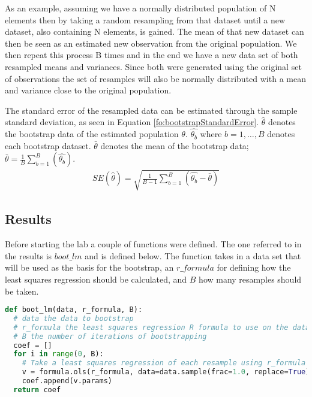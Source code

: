 As an example, assuming we have a normally distributed population of N elements then by taking a random resampling from that dataset until a new dataset, also containing N elements, is gained. The mean of that new dataset can then be seen as an estimated new observation from the original population. We then repeat this process B times and in the end we have a new data set of both resampled means and variances. Since both were generated using the original set of observations the set of resamples will also be normally distributed with a mean and variance close to the original population.
\fi

The standard error of the resampled data can be estimated through the sample standard deviation, as seen in Equation \ref{fo:bootstrapStandardError}. $\hat{\theta}$ denotes the bootstrap data of the estimated population $\theta$. $\hat{\theta_{b}}$ where $b=1,\dots,B$ denotes each bootstrap dataset. $\bar{\theta}$ denotes the mean of the bootstrap data; $\bar{\theta} = \frac{1}{B} \sum_{b=1}^{B}(\hat{\theta_{b}})$.
\begin{align}\label{fo:bootstrapStandardError}
	SE(\hat{\theta}) = \sqrt{\frac{1}{B-1} \sum_{b=1}^{B}(\hat{\theta_{b}} - \bar{\theta})} 
\end{align}


\subsection{Results}%

Before starting the lab a couple of functions were defined. The one referred to in the results is $boot\_lm$ and is defined below. The function takes in a data set that will be used as the basis for the bootstrap, an $r\_formula$ for defining how the least squares regression should be calculated, and $B$ how many resamples should be taken.

\begin{lstlisting}[language=Python]
def boot_lm(data, r_formula, B):
  # data the data to bootstrap
  # r_formula the least squares regression R formula to use on the data
  # B the number of iterations of bootstrapping
  coef = []
  for i in range(0, B):
    # Take a least squares regression of each resample using r_formula
    v = formula.ols(r_formula, data=data.sample(frac=1.0, replace=True)).fit()
    coef.append(v.params)
  return coef
\end{lstlisting}


